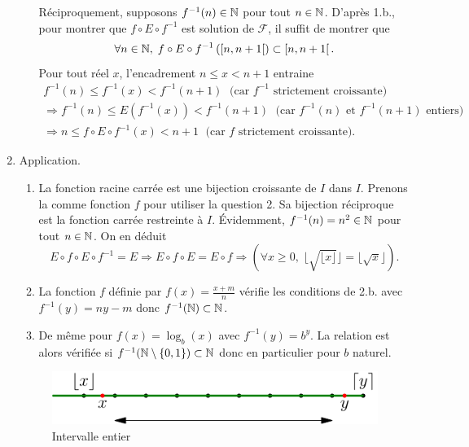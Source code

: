 \begin{enumerate}
\begin{enumerate}
Réciproquement, supposons $f^{-1} (n) \in \mathbb{N}$ pour tout $n \in \mathbb{N}$. D'après 1.b., pour montrer que $f \circ E \circ f^{-1}$ est solution de $\mathcal{F}$, il suffit de montrer que 
\[
  \forall n \in \mathbb{N}, \;f\circ E \circ f^{-1}\left( \left[ n,n+1 \right[\right) \subset \left[ n, n+1 \right[.
\]
Pour tout réel $x$, l'encadrement $n \leq x < n + 1 $ entraine
\begin{multline*}
  f^{-1}(n) \leq f^{-1}(x) < f^{-1}(n+1) \; \text{ (car $f^{-1}$ strictement croissante)} \\
  \Rightarrow f^{-1}(n) \leq E(f^{-1}(x)) < f^{-1}(n+1) \; \text{ (car $f^{-1}(n)$ et $f^{-1}(n+1)$ entiers)} \\
  \Rightarrow n \leq f \circ E \circ f^{-1} (x) < n+1 \; \text{ (car $f$ strictement croissante)}.
\end{multline*}
  \end{enumerate}

  \item Application.
  \begin{enumerate}
    \item La fonction racine carrée est une bijection croissante de $I$ dans $I$. Prenons la comme fonction $f$ pour utiliser la question 2. Sa bijection réciproque est la fonction carrée restreinte à $I$. \'Evidemment, $f^{-1}(n) = n^2 \in \mathbb{N}$ pour tout $n\in \mathbb{N}$. On en déduit
\[
  E\circ f \circ E \circ f^{-1} = E 
  \Rightarrow E\circ f \circ E  = E \circ f
  \Rightarrow \left( \forall x \geq 0, \; \lfloor \sqrt{\lfloor x \rfloor}\rfloor = \lfloor \sqrt{x}\rfloor \right). 
\]
    \item La fonction $f$ définie par $f(x) = \frac{x + m}{n}$ vérifie les conditions de 2.b. avec $f^{-1}(y) = ny -m$ donc $f^{-1}(\mathbb{N}) \subset \mathbb{N}$. 
    \item De même pour $f(x) = \log_b(x)$ avec $f^{-1}(y) = b^y$. La relation est alors vérifiée si $f^{-1}(\mathbb{N} \setminus \left\lbrace 0,1 \right\rbrace) \subset \mathbb{N}$ donc en particulier pour $b$ naturel.
  \end{enumerate}

\begin{figure}[h!]
  \centering
  \includegraphics{Cracent_1.pdf}
  \caption{Intervalle entier}
  \label{fig:Cracent_1}
\end{figure}
  

\end{enumerate}
